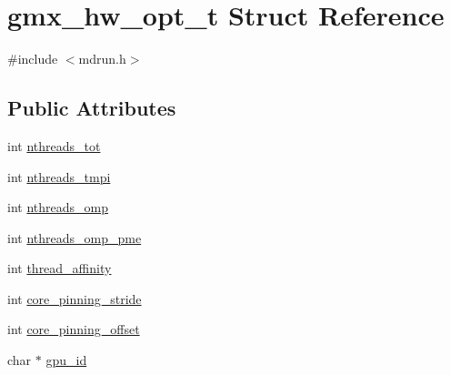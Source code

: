 \hypertarget{structgmx__hw__opt__t}{\section{gmx\-\_\-hw\-\_\-opt\-\_\-t \-Struct \-Reference}
\label{structgmx__hw__opt__t}
}


{\ttfamily \#include $<$mdrun.\-h$>$}

\subsection*{\-Public \-Attributes}
\begin{DoxyCompactItemize}
\item 
int \hyperlink{structgmx__hw__opt__t_aff4425b9aac9317a33116944d9950a28}{nthreads\-\_\-tot}
\item 
int \hyperlink{structgmx__hw__opt__t_a538054af51935efb5b1e581d35c20125}{nthreads\-\_\-tmpi}
\item 
int \hyperlink{structgmx__hw__opt__t_aeed4876ac29ec60b336d988f6049b296}{nthreads\-\_\-omp}
\item 
int \hyperlink{structgmx__hw__opt__t_aaa1c49e7208c79b725eaac36f8763bfc}{nthreads\-\_\-omp\-\_\-pme}
\item 
int \hyperlink{structgmx__hw__opt__t_a5785a3020079b5be75c62405e03cb1e2}{thread\-\_\-affinity}
\item 
int \hyperlink{structgmx__hw__opt__t_a917fbedfa6b12b7de8de61efa91ca0c4}{core\-\_\-pinning\-\_\-stride}
\item 
int \hyperlink{structgmx__hw__opt__t_a9890b8d5e4db45f609f61a17f2823939}{core\-\_\-pinning\-\_\-offset}
\item 
char $\ast$ \hyperlink{structgmx__hw__opt__t_ae6419813ec7a1e273cbd78627db3fd0f}{gpu\-\_\-id}
\end{DoxyCompactItemize}


